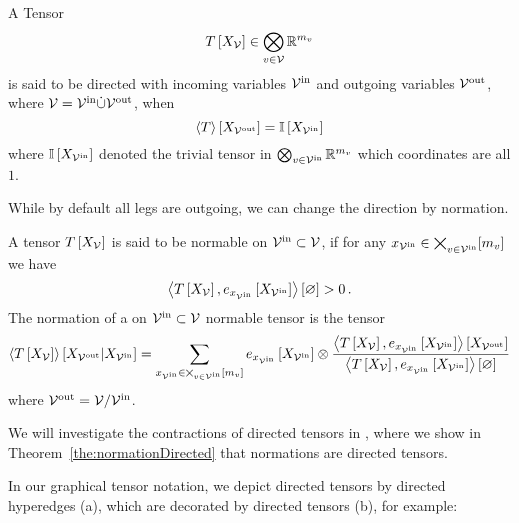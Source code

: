 \begin{definition}\label{def:directedTensor}
	A Tensor
		\[ T\left[X_{\mathcal{V}}\right] \in\bigotimes_{v\in\mathcal{V}}\mathbb{R}^{m_{v}} \]
	is said to be directed with incoming variables $\mathcal{V}^{\mathrm{in}}$ and outgoing variables $\mathcal{V}^{\mathrm{out}}$, where $\mathcal{V}=\mathcal{V}^{\mathrm{in}}\dot{\cup}\mathcal{V}^{\mathrm{out}}$, when
		\[ \left\langle T\right\rangle \left[ X_{\mathcal{V}^{\mathrm{out}}} \right] =  \mathbb{I}\left[X_{\mathcal{V}^{\mathrm{in}}}\right] \]
	where $\mathbb{I}\left[X_{\mathcal{V}^{\mathrm{in}}}\right]$ denoted the trivial tensor in  $\bigotimes_{v\in\mathcal{V}^{\mathrm{in}}}\mathbb{R}^{m_{v}}$ which coordinates are all $1$.
\end{definition}

While by default all legs are outgoing, we can change the direction by normation.

\begin{definition}\label{def:normation}
	A tensor $T\left[X_{\mathcal{V}}\right]$ is said to be normable on $\mathcal{V}^{\mathrm{in}}\subset\mathcal{V}$, if for any $x_{\mathcal{V}^{\mathrm{in}}}\in\bigtimes_{v\in\mathcal{V}^{\mathrm{in}}}[m_{v}]$ we have
		\[ \left\langle T\left[X_{\mathcal{V}}\right],e_{x_{\mathcal{V}^{\mathrm{in}}}}\left[X_{\mathcal{V}^{\mathrm{in}}}\right]\right\rangle \left[ \varnothing \right] > 0 \, . \]
	The normation of a on $\mathcal{V}^{\mathrm{in}}\subset\mathcal{V}$ normable tensor is the tensor
	\begin{align*}
		\left\langle T\left[X_{\mathcal{V}}\right]\right\rangle \left[ X_{\mathcal{V}^{\mathrm{out}}} | X_{\mathcal{V}^{\mathrm{in}}} \right] =
		\sum_{x_{\mathcal{V}^{\mathrm{in}}}\in\bigtimes_{v\in\mathcal{V}^{\mathrm{in}}}[m_{v}]}
		e_{x_{\mathcal{V}^{\mathrm{in}}}}\left[X_{\mathcal{V}^{\mathrm{in}}}\right] \otimes \frac{
		\left\langle T\left[X_{\mathcal{V}}\right],e_{x_{\mathcal{V}^{\mathrm{in}}}}\left[X_{\mathcal{V}^{\mathrm{in}}}\right]\right\rangle \left[ X_{\mathcal{V}^{\mathrm{out}}} \right]
		}{
		\left\langle T\left[X_{\mathcal{V}}\right],e_{x_{\mathcal{V}^{\mathrm{in}}}}\left[X_{\mathcal{V}^{\mathrm{in}}}\right]\right\rangle \left[ \varnothing \right]
		}
	\end{align*}
	where $\mathcal{V}^{\mathrm{out}} = \mathcal{V}/\mathcal{V}^{\mathrm{in}}$.
\end{definition}

We will investigate the contractions of directed tensors in , where we show in Theorem~\ref{the:normationDirected} that normations are directed tensors.


In our graphical tensor notation, we depict directed tensors by directed hyperedges (a), which are decorated by directed tensors (b), for example:
	\begin{center}
		
	\end{center}



